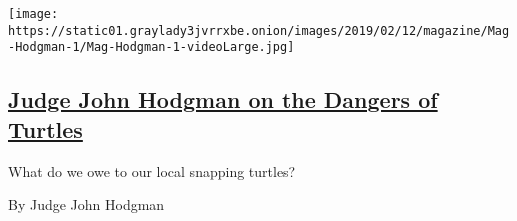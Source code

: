 \begin{enumerate}
  \texttt{[image: https://static01.graylady3jvrrxbe.onion/images/2019/02/12/magazine/Mag-Hodgman-1/Mag-Hodgman-1-videoLarge.jpg]}

  \hypertarget{judge-john-hodgman-on-the-dangers-of-turtles}{%
  \subsection{\texorpdfstring{\href{/2019/06/27/magazine/judge-john-hodgman-on-the-dangers-of-turtles.html}{Judge
  John Hodgman on the Dangers of
  Turtles}}{Judge John Hodgman on the Dangers of Turtles}}\label{judge-john-hodgman-on-the-dangers-of-turtles}}

  What do we owe to our local snapping turtles?

  By Judge John Hodgman
\end{enumerate}

